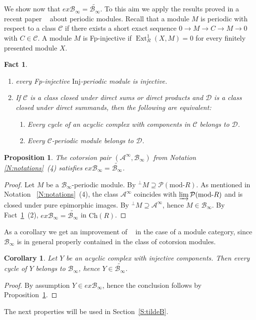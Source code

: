 \documentclass[11pt,a4paper,reqno]{amsart}
\newcommand{\Ext}{\operatorname{Ext}}
\newcommand{\A}{\mathcal{A}}
\newcommand{\B}{\mathcal{B}}
\newcommand{\C}{\mathcal{C}}
\newcommand{\D}{\mathcal{D}}
\newcommand{\clP}{\mathcal{P}}
\newcommand{\Ch}{\mathrm{Ch}}
\newcommand{\Inj}{\mathrm{Inj}}
\newcommand{\modR}{\mathrm{mod}\textrm{-}R}
\theoremstyle{plain}
\newtheorem{prop}[thm]{Proposition}
\newtheorem{cor}[thm]{Corollary}
\newtheorem{fact}[thm]{Fact}
\theoremstyle{definition}
\theoremstyle{remark}
\begin{document}
  We show now that $ex\B_{\infty}=\widetilde{\B_{\infty}}$. To this aim we apply the results proved in a recent paper ~\cite{BCIE} about periodic modules.
   Recall that a module $M$ is periodic with respect to a class $\C$ if there exists a short exact sequence $0\to M\to C\to M\to 0$ with $C\in \C$. A module $M$ is Fp-injective if $\Ext^1_R(X, M)=0$ for every finitely presented module $X$.

\begin{fact}\label{F:periodic}
 \begin{enumerate}
\item \cite[Proposition 3.8~(1)]{BCIE} every Fp-injective $\Inj$-periodic module is injective.
 \item \cite{EFI} If $\C$ is  a class closed under direct sums or direct products and  $\D$ is a class closed under direct summands, then the following are equivalent:
\begin{enumerate}
\item[(a)] Every cycle of an acyclic complex with components in $\C$ belongs to $\D$.
\item[(b)]  Every $\C$-periodic module belongs to $\D$.
\end{enumerate}

\end{enumerate}
\end{fact}

%
%
%
%
%
%
%
%
%
%
%
%

 \begin{prop}\label{P:ex-B-infty} The cotorsion pair $(\A^{\infty}, \B_{\infty})$ from Notation~
 \ref{N:notations}~(4) satisfies $ex\B_{\infty}=\widetilde{\B_{\infty}}$.
%
%
%
%
%
%
\end{prop}
%
\begin{proof}  Let $M$ be a $\B_{\infty}$-periodic module. By \cite[Lemma 3.4]{BCIE} ${}^\perp M\supseteq \clP(\modR)$. As mentioned in Notation~
 \ref{N:notations}~(4), the class  $\A^{\infty}$ coincides with $\varinjlim \clP(\modR)$ and is closed under pure epimorphic images. By \cite[Theorem 3.7]{BCIE} ${}^\perp M\supseteq \A^{\infty}$, hence $M\in\B_{\infty}$. By Fact~\ref{F:periodic}~(2), $ex\B_{\infty}=\widetilde{\B_{\infty}}$ in $\Ch(R)$.
  \end{proof}
%

As a corollary we get  an improvement of ~\cite[Corollary 5.9]{Stopurity} in the case of a module category, since $ \B_{\infty}$ is in general properly contained in the class of cotorsion modules.
\begin{cor}\label{C:exInj}
Let $Y$ be an acyclic complex with injective components. Then every cycle of $Y$ belongs to $ \B_{\infty}$, hence $Y\in \widetilde{ \B_{\infty}}$.
\end{cor}
%
\begin{proof} By assumption $Y\in ex\B_{\infty}$, hence the conclusion follows by Proposition~\ref{P:ex-B-infty}.
%
%
 \end{proof}
%
%
%
%
 The next properties will be used in Section~\ref{S:tildeB}.
\end{document}
